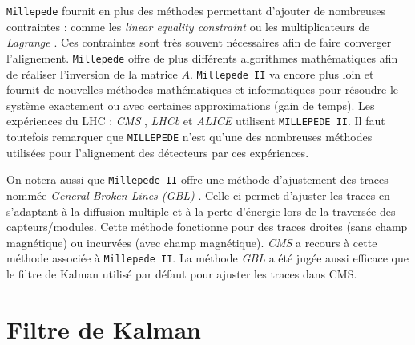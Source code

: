 \begin{appendices}
   \medskip
   
   \texttt{Millepede} fournit en plus des m\'ethodes permettant d'ajouter de nombreuses contraintes : comme les \textit{linear equality constraint} ou les multiplicateurs de \textit{Lagrange} \cite{Blusk:2007zza}. Ces contraintes sont tr\`es souvent n\'ecessaires afin de faire converger l'alignement. \texttt{Millepede} offre de plus diff\'erents algorithmes math\'ematiques afin de r\'ealiser l'inversion de la matrice $A$. \texttt{Millepede II} va encore plus loin et fournit de nouvelles m\'ethodes math\'ematiques et informatiques pour r\'esoudre le syst\`eme exactement ou avec certaines approximations (gain de temps). Les exp\'eriences du LHC : \textit{CMS} \cite{Behr:2012gf} \cite{Chatrchyan:2014wfa}, \textit{LHCb} \cite{Gersabeck:2008sy} \cite{Blusk:2007zza} et \textit{ALICE} \cite{Rossi:2011gv} \cite{Aamodt:2010aa} \cite{Blusk:2007zza} utilisent \texttt{MILLEPEDE II}. Il faut toutefois remarquer que \texttt{MILLEPEDE} n'est qu'une des nombreuses m\'ethodes utilis\'ees pour l'alignement des d\'etecteurs par ces exp\'eriences.
   
   \medskip
   
   On notera aussi que \texttt{Millepede II} offre une m\'ethode d'ajustement des traces nomm\'ee \textit{General Broken Lines (GBL)} \cite{Kleinwort:2012np}. Celle-ci permet d'ajuster les traces en s'adaptant \`a la diffusion multiple et \`a la perte d'\'energie lors de la travers\'ee des capteurs/modules. Cette m\'ethode fonctionne pour des traces droites (sans champ magn\'etique) ou incurv\'ees (avec champ magn\'etique). \textit{CMS} \cite{Chatrchyan:2014wfa} \cite{Schleper:2008zz} a recours \`a cette m\'ethode associ\'ee \`a \texttt{Millepede II}. La m\'ethode \textit{GBL} a \'et\'e jug\'ee aussi efficace que le filtre de Kalman utilis\'e par d\'efaut pour ajuster les traces dans CMS. 
   
   
   \chapter{Filtre de Kalman}
   \label{annexe:kalman}
   

\end{appendices}
